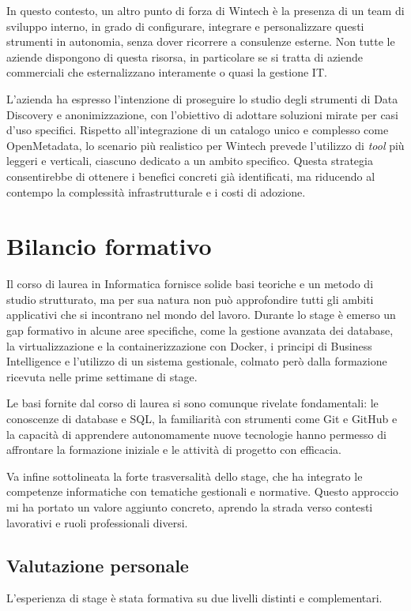 In questo contesto, un altro punto di forza di Wintech è la presenza di un team di sviluppo interno, in grado di configurare, integrare e personalizzare questi strumenti in autonomia, 
senza dover ricorrere a consulenze esterne. Non tutte le aziende dispongono di questa risorsa, in particolare se si tratta di aziende commerciali che esternalizzano interamente o quasi la gestione IT.

L'azienda ha espresso l'intenzione di proseguire lo studio degli strumenti di Data Discovery e anonimizzazione, con l'obiettivo di adottare soluzioni mirate per casi d'uso specifici. 
Rispetto all'integrazione di un catalogo unico e complesso come OpenMetadata, lo scenario più realistico per Wintech prevede l'utilizzo di \emph{tool} più leggeri e verticali, 
ciascuno dedicato a un ambito specifico. Questa strategia consentirebbe di ottenere i benefici concreti già identificati, ma riducendo al contempo la complessità infrastrutturale e i costi di adozione.


\section{Bilancio formativo}
Il corso di laurea in Informatica fornisce solide basi teoriche e un metodo di studio strutturato, ma per sua natura non può approfondire tutti 
gli ambiti applicativi che si incontrano nel mondo del lavoro. Durante lo stage è emerso un gap formativo in alcune aree specifiche, come 
la gestione avanzata dei database, la virtualizzazione e la containerizzazione con Docker, i principi di Business Intelligence e l'utilizzo di un sistema gestionale, 
colmato però dalla formazione ricevuta nelle prime settimane di stage.

Le basi fornite dal corso di laurea si sono comunque rivelate fondamentali: le conoscenze di database e SQL, la familiarità con strumenti come Git e 
GitHub e la capacità di apprendere autonomamente nuove tecnologie hanno permesso di affrontare la formazione iniziale e le attività di progetto con efficacia.

Va infine sottolineata la forte trasversalità dello stage, che ha integrato le competenze informatiche con tematiche gestionali e normative. Questo approccio mi ha portato un valore 
aggiunto concreto, aprendo la strada verso contesti lavorativi e ruoli professionali diversi.


\subsection{Valutazione personale}
L'esperienza di stage è stata formativa su due livelli distinti e complementari.


